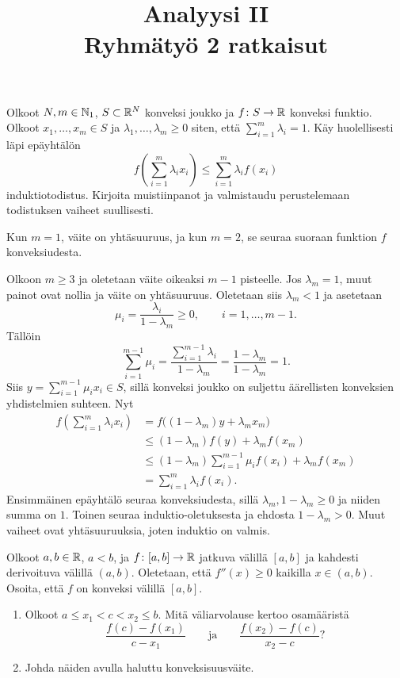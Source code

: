 \documentclass[11pt,a4paper]{amsart}
\title{Analyysi II\\Ryhmätyö 2 ratkaisut}
\author{}
\date{}
\begin{document}

\setcounter{exercise}{1}

\begin{exercise}
  Olkoot \(N,m\in\mathbb{N}_1\), \(S\subset\mathbb{R}^N\) konveksi joukko ja
  \(f\colon S\to\mathbb{R}\) konveksi funktio. Olkoot
  \(x_1,\ldots,x_m\in S\) ja \(\lambda_1,\ldots,\lambda_m\geq 0\)
  siten, että \(\sum_{i=1}^m\lambda_i=1\).
  Käy huolellisesti läpi epäyhtälön
  \[
    f\!\left(\sum_{i=1}^m\lambda_i x_i\right)
    \leq \sum_{i=1}^m\lambda_i f(x_i)
  \]
  induktiotodistus. Kirjoita muistiinpanot ja valmistaudu perustelemaan
  todistuksen vaiheet suullisesti.
\end{exercise}

\begin{solution}
  Kun \(m=1\), väite on yhtäsuuruus, ja kun \(m=2\), se seuraa
  suoraan funktion \(f\) konveksiudesta.

  Olkoon \(m\geq3\) ja oletetaan väite oikeaksi \(m-1\) pisteelle.
  Jos \(\lambda_m=1\), muut painot ovat nollia ja väite on yhtäsuuruus.
  Oletetaan siis \(\lambda_m<1\) ja asetetaan
  \[
    \mu_i=\frac{\lambda_i}{1-\lambda_m}\geq0,
    \qquad i=1,\ldots,m-1.
  \]
  Tällöin
  \[
    \sum_{i=1}^{m-1}\mu_i
    =\frac{\sum_{i=1}^{m-1}\lambda_i}{1-\lambda_m}
    =\frac{1-\lambda_m}{1-\lambda_m}=1.
  \]
  Siis \(y=\sum_{i=1}^{m-1}\mu_i x_i\in S\), sillä konveksi joukko on suljettu
  äärellisten konveksien yhdistelmien suhteen. Nyt
  \[
    \begin{aligned}
      f\!\left(\sum_{i=1}^m\lambda_i x_i\right)
      &=f\bigl((1-\lambda_m)y+\lambda_m x_m\bigr)\\
      &\leq(1-\lambda_m)f(y)+\lambda_m f(x_m)\\
      &\leq(1-\lambda_m)\sum_{i=1}^{m-1}\mu_i f(x_i)
      +\lambda_m f(x_m)\\
      &=\sum_{i=1}^m\lambda_i f(x_i).
    \end{aligned}
  \]
  Ensimmäinen epäyhtälö seuraa konveksiudesta, sillä
  \(\lambda_m,1-\lambda_m\geq0\) ja niiden summa on \(1\).
  Toinen seuraa induktio-oletuksesta ja ehdosta \(1-\lambda_m>0\).
  Muut vaiheet ovat yhtäsuuruuksia, joten induktio on valmis.
\end{solution}

\begin{exercise}
  Olkoot \(a,b\in\mathbb{R}\), \(a<b\), ja \(f\colon[a,b]\to\mathbb{R}\) jatkuva
  välillä \([a,b]\) ja kahdesti derivoituva välillä \((a,b)\).
  Oletetaan, että \(f''(x)\geq 0\) kaikilla \(x\in(a,b)\).
  Osoita, että \(f\) on konveksi välillä \([a,b]\).
  \begin{enumerate}[label=(\alph*)]
    \item Olkoot \(a\leq x_1<c<x_2\leq b\). Mitä väliarvolause kertoo
      osamääristä
      \[
        \frac{f(c)-f(x_1)}{c-x_1}
        \qquad\text{ja}\qquad
        \frac{f(x_2)-f(c)}{x_2-c}?
      \]
    \item Johda näiden avulla haluttu konveksisuusväite.
  \end{enumerate}
\end{exercise}
\end{document}
